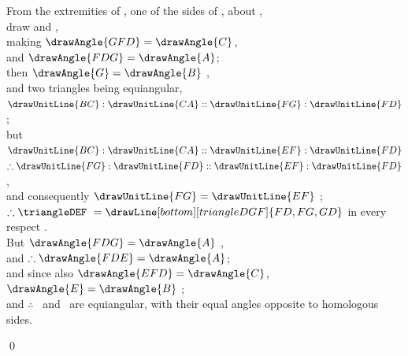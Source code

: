 \documentclass[booklanguage=english]{byrnebook}
\begin{document}
\begin{center}
From the extremities of , one of the sides of \triangleDEF, about ,\\
draw  and ,\\
making $\drawAngle{GFD} = \drawAngle{C}$,\\
and $\drawAngle{FDG} = \drawAngle{A}$;\\
then $\drawAngle{G} = \drawAngle{B}$ ,\\
and two triangles being equiangular,\\
$\drawUnitLine{BC} : \drawUnitLine{CA} :: \drawUnitLine{FG} : \drawUnitLine{FD}$ ;\\
but $\drawUnitLine{BC} : \drawUnitLine{CA} :: \drawUnitLine{EF} : \drawUnitLine{FD}$ \byref{\hypref}\\
$\therefore \drawUnitLine{FG} : \drawUnitLine{FD} :: \drawUnitLine{EF} : \drawUnitLine{FD}$ ,\\
and consequently $\drawUnitLine{FG} = \drawUnitLine{EF}$ ;\\
$\therefore \triangleDEF\ =
\drawLine[bottom][triangleDGF]{FD,FG,GD}$ in every respect .\\
But $\drawAngle{FDG} = \drawAngle{A}$ \byref{\constref},\\
and $\therefore \drawAngle{FDE} = \drawAngle{A}$;\\
and since also $\drawAngle{EFD} = \drawAngle{C}$,\\
$\drawAngle{E} = \drawAngle{B}$ ;\\
and $\therefore$ \triangleABC\ and \triangleDEF\ are equiangular, with their equal angles opposite to homologous sides.
\end{center}

\qed
\end{document}
